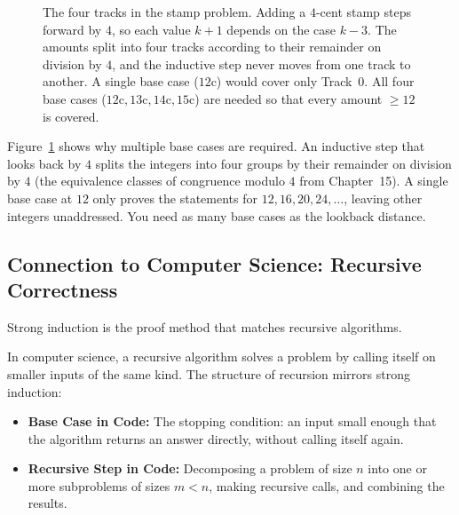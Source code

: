 \begin{figure}[htbp]
\caption{The four tracks in the stamp problem. Adding a $4$-cent stamp steps forward by $4$, so each value $k+1$ depends on the case $k-3$. The amounts split into four tracks according to their remainder on division by $4$, and the inductive step never moves from one track to another. A single base case ($12\text{c}$) would cover only Track~0. All four base cases ($12\text{c}, 13\text{c}, 14\text{c}, 15\text{c}$) are needed so that every amount $\ge 12$ is covered.}
\label{18:fig-stamp-tracks}
\end{figure}

Figure~\ref{18:fig-stamp-tracks} shows why multiple base cases are required. An inductive step that looks back by $4$ splits the integers into four groups by their remainder on division by $4$ (the equivalence classes of congruence modulo $4$ from Chapter~15). A single base case at $12$ only proves the statements for $12, 16, 20, 24, \dots$, leaving other integers unaddressed. You need as many base cases as the lookback distance.

\subsection{Connection to Computer Science: Recursive Correctness}

Strong induction is the proof method that matches recursive algorithms.

In computer science, a recursive algorithm solves a problem by calling itself on smaller inputs of the same kind. The structure of recursion mirrors strong induction:
\begin{itemize}
\item \textbf{Base Case in Code:} The stopping condition: an input small enough that the algorithm returns an answer directly, without calling itself again.
\item \textbf{Recursive Step in Code:} Decomposing a problem of size $n$ into one or more subproblems of sizes $m < n$, making recursive calls, and combining the results.
\end{itemize}

